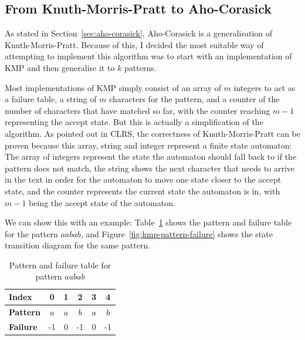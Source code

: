 \documentclass[ %
                    author={Dominic Joseph Moylett},
                    degree={MEng},
                     title={Dictionary Matching with Fingerprints},
                  subtitle={An Empirical Analysis},
                      type={Research},
                      year={2014} ]{dissertation}
\begin{document}
\subsection{From Knuth-Morris-Pratt to Aho-Corasick}

As stated in Section~\ref{sec:aho-corasick}, Aho-Corasick\cite{Aho:1975:ESM:360825.360855} is a generalisation of Knuth-Morris-Pratt. Because of this, I decided the most suitable way of attempting to implement this algorithm was to start with an implementation of KMP and then generalise it to $k$ patterns.

Most implementations of KMP simply consist of an array of $m$ integers to act as a failure table, a string of $m$ characters for the pattern, and a counter of the number of characters that have matched so far, with the counter reaching $m - 1$ representing the accept state. But this is actually a simplification of the algorithm. As pointed out in CLRS\cite{clrs:kmp}, the correctness of Knuth-Morris-Pratt can be proven because this array, string and integer represent a finite state automaton: The array of integers represent the state the automaton should fall back to if the pattern does not match, the string shows the next character that needs to arrive in the text in order for the automaton to move one state closer to the accept state, and the counter represents the current state the automaton is in, with $m - 1$ being the accept state of the automaton.

We can show this with an example: Table~\ref{tab:kmp-pattern-failure} shows the pattern and failure table for the pattern $aabab$, and Figure~\ref{fig:kmp-pattern-failure} shows the state transition diagram for the same pattern.

\begin{table}[t]
  \centering
  \begin{tabular}{|l|c|c|c|c|c|}
    \hline
    \textbf{Index} & 0 & 1 & 2 & 3 & 4 \\\hline
    \textbf{Pattern} & $a$ & $a$ & $b$ & $a$ & $b$ \\\hline
    \textbf{Failure} & -1 & 0 & -1 & 0 & -1\\\hline
  \end{tabular}
  \caption{Pattern and failure table for pattern $aabab$}
  \label{tab:kmp-pattern-failure}
\end{table}
\end{document}
